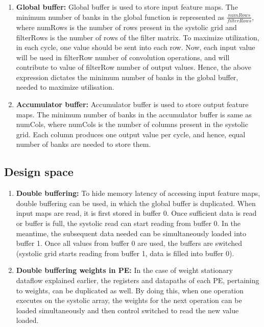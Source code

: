 
\begin{enumerate}
    \item \textbf{Global buffer:} Global buffer is used to store input feature maps. The minimum number of banks in the global function is represented as $\frac{numRows}{filterRows}$, where numRows is the number of rows present in the systolic grid and filterRows is the number of rows of the filter matrix. To maximize utilization, in each cycle, one value should be sent into each row. Now, each input value will be used in filterRow number of convolution operations, and will contribute to value of filterRow number of output values. Hence, the above expression dictates the minimum number of banks in the global buffer, needed to maximize utilisation.
    
    \item \textbf{Accumulator buffer:} Accumulator buffer is used to store output feature maps. The minimum number of banks in the accumulator buffer is same as numCols, where numCols is the number of columns present in the systolic grid. Each column produces one output value per cycle, and hence, equal number of banks are needed to store them.
\end{enumerate}

\subsection{Design space}

\begin{enumerate}
    \item \textbf{Double buffering:} To hide memory latency of accessing input feature maps, double buffering can be used, in which the global buffer is duplicated. When input maps are read, it is first stored in buffer 0. Once sufficient data is read or buffer is full, the systolic read can start reading from buffer 0. In the meantime, the subsequent data needed can be simultaneously loaded into buffer 1. Once all values from buffer 0 are used, the buffers are switched (systolic grid starts reading from buffer 1, data is filled into buffer 0).
    
    \item \textbf{Double buffering weights in PE:} In the case of weight stationary dataflow explained earlier, the registers and datapaths of each PE, pertaining to weights, can be duplicated as well. By doing this, when one operation executes on the systolic array, the weights for the next operation can be loaded simultaneously and then control switched to read the new value loaded.
\end{enumerate}

